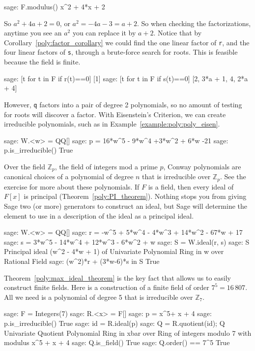 %
\begin{sageexample}
sage: F.modulus()
x^2 + 4*x + 2
\end{sageexample}
%
So $a^2+4a+2=0$, or $a^2=-4a-3=a+2$.  So when checking the factorizations, anytime you see an $a^2$ you can replace it by $a+2$.  Notice that by Corollary~\ref{poly:factor_corollary} we could find the one linear factor of \verb?r?, and the four linear factors of \verb?s?, through a brute-force search for roots.  This is feasible because the field is finite.
%
\begin{sageexample}
sage: [t for t in F if r(t)==0]
[1]
sage: [t for t in F if s(t)==0]
[2, 3*a + 1, 4, 2*a + 4]
\end{sageexample}
%
However, \verb?q? factors into a pair of degree 2 polynomials, so no amount of testing for roots will discover a factor.
%
With Eisenstein's Criterion, we can create irreducible polynomials, such as in Example~\ref{example:poly:poly_eisen}.
%
\begin{sageexample}
sage: W.<w> = QQ[]
sage: p = 16*w^5 - 9*w^4 +3*w^2 + 6*w -21
sage: p.is_irreducible()
True
\end{sageexample}
%
Over the field ${\mathbb Z}_p$, the field of integers mod a prime $p$, Conway polynomials are canonical choices of a polynomial of degree $n$ that is irreducible over ${\mathbb Z}_p$.  See the exercise for more about these polynomials.
%
%
If $F$ is a field, then every ideal of $F[x]$ is principal (Theorem~\ref{poly:PI_theorem}).  Nothing stops you from giving Sage two (or more) generators to construct an ideal, but Sage will determine the element to use in a description of the ideal as a principal ideal.
%
\begin{sageexample}
sage: W.<w> = QQ[]
sage: r = -w^5 + 5*w^4 - 4*w^3 + 14*w^2 - 67*w + 17
sage: s = 3*w^5 - 14*w^4 + 12*w^3 - 6*w^2 + w
sage: S = W.ideal(r, s)
sage: S
Principal ideal (w^2 - 4*w + 1) of
Univariate Polynomial Ring in w over Rational Field
sage: (w^2)*r + (3*w-6)*s in S
True
\end{sageexample}
%
Theorem~\ref{poly:max_ideal_theorem} is the key fact that allows us to easily construct finite fields.  Here is a construction of a finite field of order $7^5=16\,807$.  All we need is a polynomial of degree 5 that is irreducible over ${\mathbb Z}_7$.
%
\begin{sageexample}
sage: F = Integers(7)
sage: R.<x> = F[]
sage: p = x^5+ x + 4
sage: p.is_irreducible()
True
sage: id = R.ideal(p)
sage: Q = R.quotient(id); Q
Univariate Quotient Polynomial Ring in xbar over
Ring of integers modulo 7 with modulus x^5 + x + 4
sage: Q.is_field()
True
sage: Q.order() == 7^5
True
\end{sageexample}
